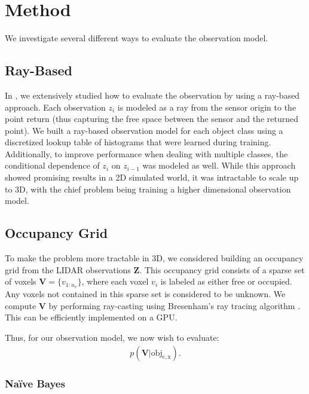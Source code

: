 \section{Method} \label{sec:method}

We investigate several different ways to evaluate the observation model.

\subsection{Ray-Based}

In \cite{ushani_raybased}, we extensively studied how to evaluate the
observation by using a ray-based approach. Each observation $z_i$ is modeled as
a ray from the sensor origin to the point return (thus capturing the free space
between the sensor and the returned point). We built a ray-based observation
model for each object class using a discretized lookup table of histograms that
were learned during training. Additionally, to improve performance when dealing
with multiple classes, the conditional dependence of $z_i$ on $z_{i-1}$ was
modeled as well. While this approach showed promising results in a 2D simulated
world, it was intractable to scale up to 3D, with the chief problem being
training a higher dimensional observation model.

\subsection{Occupancy Grid}

To make the problem more tractable in 3D, we considered building an occupancy
grid from the \ac{LIDAR} observations $\mathbf{Z}$. This occupancy grid consists
of a sparse set of voxels $\mathbf{V} = \{v_{1:n_v}\}$, where each voxel $v_i$
is labeled as either free or occupied. Any voxels not contained in this sparse
set is considered to be unknown. We compute $\mathbf{V}$ by performing
ray-casting using Bresenham's ray tracing algorithm
\cite{bresenham1965algorithm}. This can be efficiently implemented on a
\ac{GPU}.

Thus, for our observation model, we now wish to evaluate:
%
\begin{align}
  p(\mathbf{V} | \mathrm{obj_{c, x}}) \text{.} \label{eq:detection_map}
\end{align}

\subsubsection{Na\"ive Bayes} \label{sec:naive_bayes}

